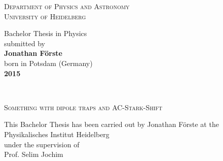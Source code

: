 \pagestyle{empty}

\begin{titlepage}
\begin{center}
 
\Large\textsc{Department of Physics and Astronomy\\
University of Heidelberg}

\vspace{15.5cm}

\normalsize
Bachelor Thesis in Physics\\
submitted by\\
\vspace{0.5cm}
\Large\textbf{Jonathan Förste}\\
\normalsize
\vspace{0.5cm}
born in Potsdam (Germany)\\
\vspace{0.5cm}
\Large\textbf{2015}
\normalsize

\newpage
\ 
\newpage




\Large\textsc{Something with dipole traps and AC-Stark-Shift}

\vspace{18cm}

\normalsize
This Bachelor Thesis has been carried out by Jonathan Förste at the\\
Physikalisches Institut Heidelberg\\
under the supervision of\\
Prof. Selim Jochim

\vfill
\end{center}

\end{titlepage}
\newpage
\ 

\pagestyle{headings}

